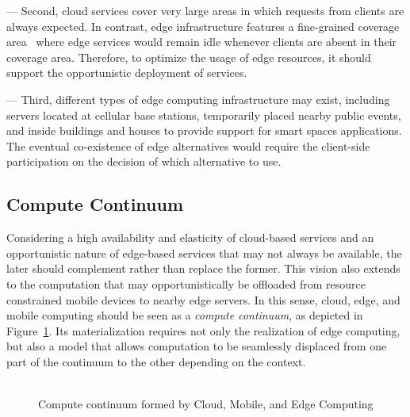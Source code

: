 
--- Second, cloud services cover very large areas in which requests from clients are always expected. In contrast, edge infrastructure features a fine-grained coverage area~\cite{Dehos14millimeter5g} where edge services would remain idle whenever clients are absent in their coverage area. Therefore, to optimize the usage of edge resources, it should support the opportunistic deployment of services.


--- Third, different types of edge computing infrastructure may exist, including servers located at cellular base stations, temporarily placed nearby public events, and inside buildings and houses to provide support for smart spaces applications. The eventual co-existence of edge alternatives would require the client-side participation on the decision of which alternative to use.


\subsection*{Compute Continuum}

Considering a high availability and elasticity of cloud-based services and an opportunistic nature of edge-based services that may not always be available, the later should complement rather than replace the former. This vision also extends to the computation that may opportunistically be offloaded from resource constrained mobile devices to nearby edge servers. In this sense, cloud, edge, and mobile computing should be seen as a \textit{compute continuum}, as depicted in Figure~\ref{fig:continuum-intro}. Its materialization requires not only the realization of edge computing, but also a model that allows computation to be seamlessly displaced from one part of the continuum to the other depending on the context. 

\begin{figure}[tbp]
	\includegraphics[width=0.0\textwidth]{figs/continuum.png}
	\caption{Compute continuum formed by Cloud, Mobile, and Edge Computing}
	\label{fig:continuum-intro}
\end{figure}
 



